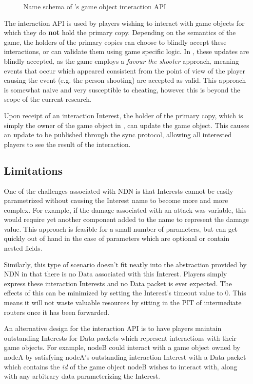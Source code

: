 \begin{figure}[H]
    \centering
    \caption{Name schema of \game{}'s game object interaction API}
    \label{fig:des:interaction-api-name}
\end{figure}

The interaction API is used by players wishing to interact with game objects for which they do \textbf{not} hold the primary copy. Depending on the semantics of the game, the holders of the primary copies can choose to blindly accept these interactions, or can validate them using game specific logic. In \game{}, these updates are blindly accepted, as the game employs a \textit{favour the shooter} approach, meaning events that occur which appeared consistent from the point of view of the player causing the event (e.g. the person shooting) are accepted as valid. This approach is somewhat naive and very susceptible to cheating, however this is beyond the scope of the current research. 

Upon receipt of an interaction Interest, the holder of the primary copy, which is simply the owner of the game object in \game{}, can update the game object. This causes an update to be published through the sync protocol, allowing all interested players to see the result of the interaction.


\subsection{Limitations}
One of the challenges associated with NDN is that Interests cannot be easily parametrized without causing the Interest name to become more and more complex. For example, if the damage associated with an attack was variable, this would require yet another component added to the name to represent the damage value. This approach is feasible for a small number of parameters, but can get quickly out of hand in the case of parameters which are optional or contain nested fields. 

Similarly, this type of scenario doesn't fit neatly into the abstraction provided by NDN in that there is no Data associated with this Interest. Players simply express these interaction Interests and no Data packet is ever expected. The effects of this can be minimized by setting the Interest's timeout value to 0. This means it will not waste valuable resources by sitting in the PIT of intermediate routers once it has been forwarded.

An alternative design for the interaction API is to have players maintain outstanding Interests for Data packets which represent interactions with their game objects. For example, nodeB could interact with a game object owned by nodeA by satisfying nodeA's outstanding interaction Interest with a Data packet which contains the \textit{id} of the game object nodeB wishes to interact with, along with any arbitrary data parameterizing the Interest. 

